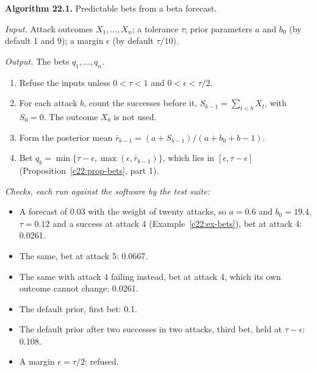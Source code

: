\begin{mdframed}[linecolor=gray!60,backgroundcolor=gray!5]
\textbf{Algorithm 22.1.} Predictable bets from a beta forecast.\par\smallskip
\textit{Input.} Attack outcomes $X_1,\dots,X_n$; a tolerance $\tau$; prior parameters $a$ and $b_0$ (by default 1 and 9); a margin $\epsilon$ (by default $\tau/10$).\par
\textit{Output.} The bets $q_1,\dots,q_n$.
\begin{enumerate}
\item Refuse the inputs unless $0<\tau<1$ and $0<\epsilon<\tau/2$.
\item For each attack $b$, count the successes before it, $S_{b-1}=\sum_{t<b}X_t$, with $S_0=0$. The outcome $X_b$ is not used.
\item Form the posterior mean $\bar r_{b-1}=(a+S_{b-1})/(a+b_0+b-1)$.
\item Bet $q_b=\min\{\tau-\epsilon,\max(\epsilon,\bar r_{b-1})\}$, which lies in $[\epsilon,\tau-\epsilon]$ (Proposition~\ref{c22:prop-bets}, part 1).
\end{enumerate}
\textit{Checks, each run against the software by the test suite:}
\begin{itemize}
\item A forecast of $0.03$ with the weight of twenty attacks, so $a=0.6$ and $b_0=19.4$, $\tau=0.12$ and a success at attack 4 (Example~\ref{c22:ex-bets}), bet at attack 4: 0.0261.
\item The same, bet at attack 5: 0.0667.
\item The same with attack 4 failing instead, bet at attack 4, which its own outcome cannot change: 0.0261.
\item The default prior, first bet: 0.1.
\item The default prior after two successes in two attacks, third bet, held at $\tau-\epsilon$: 0.108.
\item A margin $\epsilon=\tau/2$: refused.
\end{itemize}


\end{mdframed}
